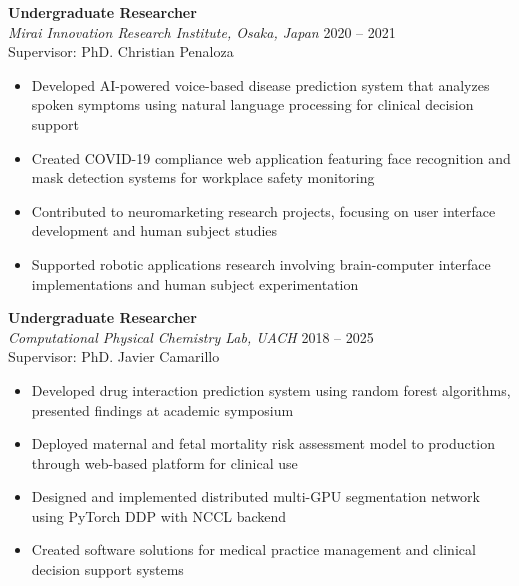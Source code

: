 \textbf{Undergraduate Researcher} \\
\textit{Mirai Innovation Research Institute, Osaka, Japan} \hfill {2020 -- 2021} \\
Supervisor: PhD. Christian Penaloza
\begin{itemize}
    \item Developed AI-powered voice-based disease prediction system that analyzes spoken symptoms using natural language processing for clinical decision support
    \item Created COVID-19 compliance web application featuring face recognition and mask detection systems for workplace safety monitoring
    \item Contributed to neuromarketing research projects, focusing on user interface development and human subject studies
    \item Supported robotic applications research involving brain-computer interface implementations and human subject experimentation
\end{itemize}

\textbf{Undergraduate Researcher} \\
\textit{Computational Physical Chemistry Lab, UACH} \hfill {2018 -- 2025} \\
Supervisor: PhD. Javier Camarillo
\begin{itemize}
    \item Developed drug interaction prediction system using random forest algorithms, presented findings at academic symposium
    \item Deployed maternal and fetal mortality risk assessment model to production through web-based platform for clinical use
    \item Designed and implemented distributed multi-GPU segmentation network using PyTorch DDP with NCCL backend
    \item Created software solutions for medical practice management and clinical decision support systems
\end{itemize}
